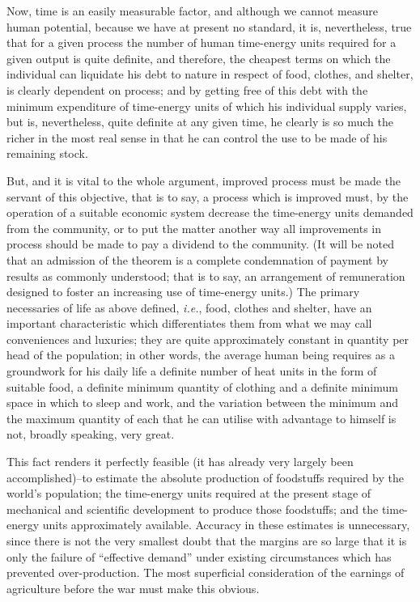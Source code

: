 \documentclass{book}
\begin{document}
Now, time is an easily measurable factor, and although we cannot measure human potential, because we have at present no standard, it is, nevertheless, true that for a given process the number of human time-energy units required for a given output is quite definite, and therefore, the cheapest terms on which the individual can liquidate his debt to nature in respect of food, clothes, and shelter, is clearly dependent on process; and by getting free of this debt with the minimum expenditure of time-energy units of which his individual supply varies, but is, nevertheless, quite definite at any given time, he clearly is so much the richer in the most real sense in that he can control the use to be made of his remaining stock.

But, and it is vital to the whole argument, improved process must be made the servant of this objective, that is to say, a process which is improved must, by the operation of a suitable economic system decrease the time-energy units demanded from the community, or to put the matter another way all improvements in process should be made to pay a dividend to the community. (It will be noted that an admission of the theorem is a complete condemnation of payment by results as commonly understood; that is to say, an arrangement of remuneration designed to foster an increasing use of time-energy units.) The primary necessaries of life as above defined, \emph{i.e.}, food, clothes and shelter, have an important characteristic which differentiates them from what we may call conveniences and luxuries; they are quite approximately constant in quantity per head of the population; in other words, the average human being requires as a groundwork for his daily life a definite number of heat units in the form of suitable food, a definite minimum quantity of clothing and a definite minimum space in which to sleep and work, and the variation between the minimum and the maximum quantity of each that he can utilise with advantage to himself is not, broadly speaking, very great.

This fact renders it perfectly feasible (it has already very largely been accomplished)–to estimate the absolute production of foodstuffs required by the world’s population; the time-energy units required at the present stage of mechanical and scientific development to produce those foodstuffs; and the time-energy units approximately available. Accuracy in these estimates is unnecessary, since there is not the very smallest doubt that the margins are so large that it is only the failure of “effective demand” under existing circumstances which has prevented over-production. The most superficial consideration of the earnings of agriculture before the war must make this obvious.
\end{document}
